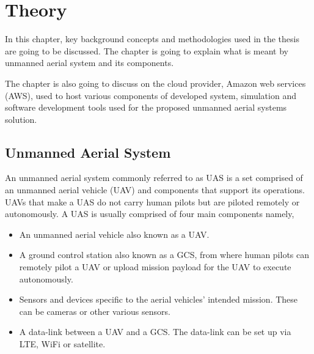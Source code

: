 


\chapter{Theory}
\label{chap:theory}

In this chapter, key background concepts and methodologies used in the thesis are going to be discussed. The chapter is going to explain what is meant by unmanned aerial system and its components.

The chapter is also going to discuss on the cloud provider, Amazon web services (AWS), used to host various components of developed system, simulation and software development tools used for the proposed unmanned aerial systems solution.



\section{Unmanned Aerial System}
\label{sec:unmanned-aerial-system}

An unmanned aerial system commonly referred to as UAS is a set comprised of an unmanned aerial vehicle (UAV) and components that support its operations. UAVs that make a UAS do not carry human pilots but are piloted remotely or autonomously. A UAS is usually comprised of four main components namely,

\begin{itemize}
    \item An unmanned aerial vehicle also known as a UAV.
    \item A ground control station also known as a GCS, from where human pilots can remotely pilot a UAV or upload mission payload for the UAV to execute autonomously.
    \item Sensors and devices specific to the aerial vehicles' intended mission. These can be cameras or other various sensors.
    \item A data-link between a UAV and a GCS. The data-link can be set up via LTE, WiFi or satellite.
\end{itemize}

